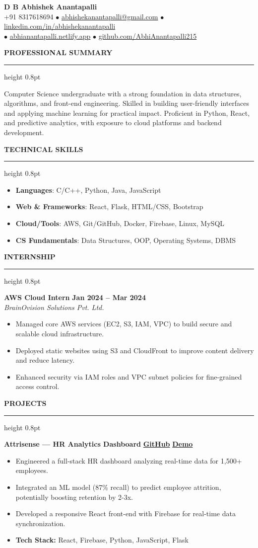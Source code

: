 \documentclass[10pt,a4paper]{article}
\newcommand{\header}[6]{
    \begin{center}
        {\Huge \textbf{#1}} \\
        \vspace{4pt}
        #2 \hspace{1em} 
        $\bullet$ \href{mailto:#3}{#3} \hspace{1em} 
        $\bullet$ \href{https://www.#4}{#4} \\
        \vspace{2pt}
        $\bullet$ \href{https://#5}{#5} \hspace{1em} 
        $\bullet$ \href{https://#6}{#6}
    \end{center}
}
\newcommand{\resumesection}[1]{
    \vspace{6pt}
    {\color{primary} \large \textbf{\MakeUppercase{#1}}}
    \vspace{6pt}
    \hrule height 0.8pt
    \vspace{4pt}
}
\newcommand{\entrybasic}[3]{
    \noindent\textbf{#1} \hfill \textbf{#2} \\
    \noindent\textit{#3}
}
\newcommand{\techstack}[1]{
    \noindent\textbf{Tech Stack:} #1
}
\newcommand{\entry}[3]{
    \noindent\textbf{#1} \hfill #2%
    \if\relax\detokenize{#3}\relax%
    \else\\\noindent\textit{#3}%
    \fi
}
\begin{document}
\pagestyle{empty}

\header{D B Abhishek Anantapalli}
    {+91 8317618694}
    {abhishekanantapalli@gmail.com}
    {linkedin.com/in/abhishekanantapalli}
    {abhianantapalli.netlify.app}
    {github.com/AbhiAnantapalli215}

\resumesection{Professional Summary}
Computer Science undergraduate with a strong foundation in data structures, algorithms, and front-end engineering. Skilled in building user-friendly interfaces and applying machine learning for practical impact. Proficient in Python, React, and predictive analytics, with exposure to cloud platforms and backend development.

\resumesection{Technical Skills}
\begin{itemize}
    \item \textbf{Languages}: C/C++, Python, Java, JavaScript
    \item \textbf{Web \& Frameworks}: React, Flask, HTML/CSS, Bootstrap
    \item \textbf{Cloud/Tools}: AWS, Git/GitHub, Docker, Firebase, Linux, MySQL
    \item \textbf{CS Fundamentals}: Data Structures, OOP, Operating Systems, DBMS
\end{itemize}

\resumesection{Internship}
\entrybasic{AWS Cloud Intern}{Jan 2024 -- Mar 2024}{BrainOvision Solutions Pvt. Ltd.}
\begin{itemize}
    \item Managed core AWS services (EC2, S3, IAM, VPC) to build secure and scalable cloud infrastructure.
    \item Deployed static websites using S3 and CloudFront to improve content delivery and reduce latency.
    \item Enhanced security via IAM roles and VPC subnet policies for fine-grained access control.
\end{itemize}

\resumesection{Projects}
\entry
  {Attrisense — HR Analytics Dashboard}
  {\href{https://github.com/AbhiAnantapalli215/Attrisense}{\textbf{GitHub}} \textbar\hspace{2pt} \href{https://attrisense.web.app}{\textbf{Demo}}}
  {}
\begin{itemize}
    \item Engineered a full-stack HR dashboard analyzing real-time data for 1,500+ employees.
    \item Integrated an ML model (87\% recall) to predict employee attrition, potentially boosting retention by 2-3x.
    \item Developed a responsive React front-end with Firebase for real-time data synchronization.
    \item \techstack{React, Firebase, Python, JavaScript, Flask}
\end{itemize}
\end{document}
